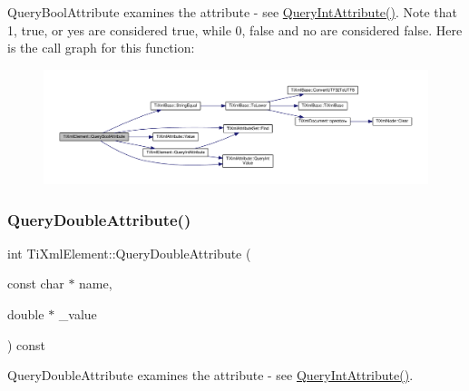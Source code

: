 Query\+Bool\+Attribute examines the attribute -\/ see \hyperlink{class_ti_xml_element_a5c0f739e0f6f5905a201364532e54a60}{Query\+Int\+Attribute()}. Note that \textquotesingle{}1\textquotesingle{}, \textquotesingle{}true\textquotesingle{}, or \textquotesingle{}yes\textquotesingle{} are considered true, while \textquotesingle{}0\textquotesingle{}, \textquotesingle{}false\textquotesingle{} and \textquotesingle{}no\textquotesingle{} are considered false. Here is the call graph for this function\+:\nopagebreak
\begin{figure}[H]
\begin{center}
\leavevmode
\includegraphics[width=350pt]{class_ti_xml_element_a5789b1488af75b6ae37a749700495ceb_cgraph}
\end{center}
\end{figure}
\mbox{\label{class_ti_xml_element_ae04bad29ddb281a7e6c662b3882e9928}} 
\subsubsection{\texorpdfstring{Query\+Double\+Attribute()}{QueryDoubleAttribute()}}
{\footnotesize\ttfamily int Ti\+Xml\+Element\+::\+Query\+Double\+Attribute (\begin{DoxyParamCaption}\item[{const char $\ast$}]{name,  }\item[{double $\ast$}]{\+\_\+value }\end{DoxyParamCaption}) const}



Query\+Double\+Attribute examines the attribute -\/ see \hyperlink{class_ti_xml_element_a5c0f739e0f6f5905a201364532e54a60}{Query\+Int\+Attribute()}. 

